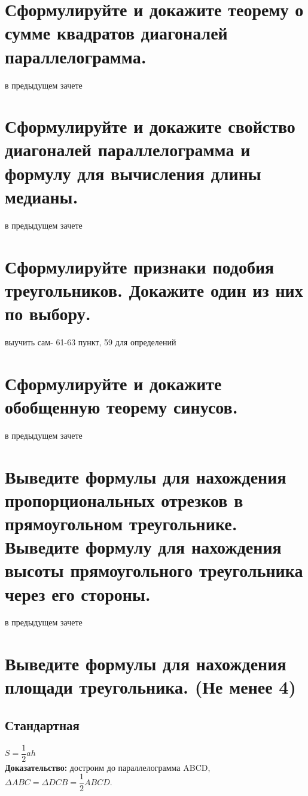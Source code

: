 \documentclass[12pt, letterpaper]{article}
\begin{document}
\section {Сформулируйте и докажите теорему о сумме квадратов диагоналей параллелограмма.}
в предыдущем зачете

\section {Сформулируйте и докажите свойство диагоналей параллелограмма и формулу для вычисления длины медианы.}
в предыдущем зачете

\section {Сформулируйте признаки подобия треугольников. Докажите один из них по выбору.}
выучить сам- 61-63 пункт, 59 для определений

\section {Сформулируйте и докажите обобщенную теорему синусов.}
в предыдущем зачете

\section {Выведите формулы для нахождения пропорциональных отрезков в прямоугольном треугольнике. Выведите формулу для нахождения высоты прямоугольного треугольника через его стороны.}
в предыдущем зачете

\section {Выведите формулы для нахождения площади треугольника. (Не менее 4)}
\subsection {Стандартная}
$S=\dfrac{1}{2}ah $ \\
\textbf{Доказательство:} достроим до параллелограмма ABCD,\\
$\Delta ABC = \Delta DCB = \dfrac{1}{2}ABCD. $ \\
\end{document}
